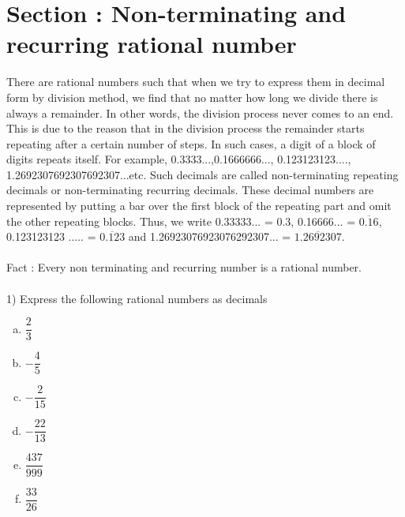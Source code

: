 \documentclass[a4paper,10pt]{article}
\begin{document}
\section{Section : Non-terminating and recurring rational number}
There are rational numbers such that when we try to express them in
decimal form by
division method, we find that no matter how long we divide there is
always a remainder. In
other words, the division process never comes to an end. This is due to
the reason that in the
division process the remainder starts repeating after a certain number
of steps. In such cases,
a digit of a block of digits repeats itself. For example,
0.3333...,0.1666666...,
0.123123123...., 1.2692307692307692307...etc. Such decimals are called
non-terminating
repeating decimals or non-terminating recurring decimals. These decimal
numbers are
represented by putting a bar over the first block of the repeating part
and omit the other
repeating blocks. Thus, we write 0.33333... = 0.3, 0.16666... =
$\overline{0.16}$, 0.123123123 ..... = $\overline{0.123}$ and
1.26923076923076292307... = $\overline{1.2692307}$.\\\\
Fact : Every non terminating and recurring number is a rational
number.\\\\
1) Express the following rational numbers as decimals
\begin{multicols}{5}
\begin{enumerate}[a.]
 \item $\dfrac{2}{3}$
 \item $-\dfrac{4}{5}$
 \item $-\dfrac{2}{15}$
 \item $-\dfrac{22}{13}$
 \item $\dfrac{437}{999}$
 \item $\dfrac{33}{26}$
\end{enumerate}
\end{multicols}
\end{document}
